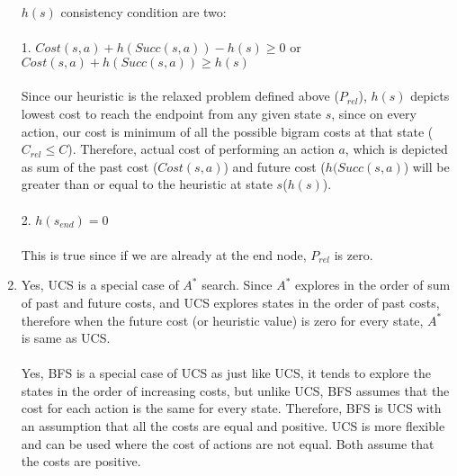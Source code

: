 \documentclass[12pt]{article}
\begin{document}
\begin{enumerate}[label=(\alph*)]
	$h(s)$ consistency condition are two: \\ \\
	1. $Cost(s,a) + h(Succ(s,a)) - h(s) \geq 0$ or $Cost(s,a) + h(Succ(s,a)) \geq h(s)$ \\ \\
	Since our heuristic is the relaxed problem defined above ($P_{rel}$), $h(s)$ depicts lowest cost to reach the endpoint from any given state $s$, since on every action, our cost is minimum of all the possible bigram costs at that state ($C_{rel} \leq C$). Therefore, actual cost of performing an action $a$, which is depicted as sum of the past cost ($Cost(s,a)$) and future cost ($h(Succ(s,a)$) will be greater than or equal to the heuristic at state $s$($h(s)$). \\ \\
	2. $h(s_{end}) = 0$ \\ \\
	This is true since if we are already at the end node, $P_{rel}$ is zero.
	
	\item Yes, UCS is a special case of $A^*$ search. Since $A^*$ explores in the order of sum of past and future costs, and UCS explores states in the order of past costs, therefore when the future cost (or heuristic value) is zero for every state, $A^*$ is same as UCS. \\ \\
	 Yes, BFS is a special case of UCS as just like UCS, it tends to explore the states in the order of increasing costs, but unlike UCS, BFS assumes that the cost for each action is the same for every state. Therefore, BFS is UCS with an assumption that all the costs are equal and positive. UCS is more flexible and can be used where the cost of actions are not equal. Both assume that the costs are positive.
	
	
\end{enumerate}
\end{document}
